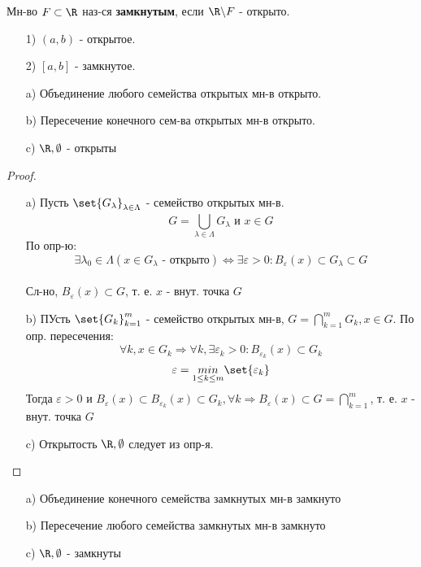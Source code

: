 \begin{definition}
Мн-во $F \subset \R$ наз-ся \textbf{замкнутым}, если $\R \backslash F$ - открыто.
\end{definition}
\begin{example}
\begin{itemize}
  \item [1) ] $(a, b)$ - открытое.
  \item [2) ] $[a, b]$ - замкнутое.
\end{itemize}
\end{example}
\begin{lemma}
  \begin{itemize}
    \item [a) ]
Объединение любого семейства открытых мн-в открыто.
    \item [b) ] Пересечение конечного сем-ва открытых мн-в открыто.
    \item [c) ] $\R, \emptyset$ - открыты
  \end{itemize}
\end{lemma}
\begin{proof}
  \begin{itemize}
    \item [a) ] Пусть $\set{G_\lambda}_{\lambda \in \Lambda}$ - семейство открытых мн-в.
      \[
        G = \bigcup_{\lambda \in \Lambda}^{}G_\lambda \text{ и } x \in G
      \]
      По опр-ю:
      \[
        \exists \lambda_0 \in \Lambda (x \in G_\lambda\text{ - открыто}) \iff \exists \varepsilon > 0 \colon B_{\varepsilon}(x) \subset G_\lambda \subset G
      \]
      \\
      Сл-но, $B_{\varepsilon}(x) \subset G$, т. е. $x$ - внут. точка $G$
    \item [b) ] ПУсть $\set{G_k}_{k = 1}^{m}$ - семейство открытых мн-в, $G = \bigcap_{k = 1}^{m} G_k, x \in G$. По опр. пересечения:
      \[
     \forall k, x \in G_k \Rightarrow \forall k, \exists \varepsilon_k > 0 \colon B_{\varepsilon_k}(x) \subset G_k
      \]
      \[
      \varepsilon = \underset{1 \leq k \leq m}{min} \set{\varepsilon_k}
      \]
      Тогда $\varepsilon > 0$ и $B_{\varepsilon}(x) \subset B_{\varepsilon_k}(x) \subset G_k, \forall k \Rightarrow B_{\varepsilon}(x) \subset G = \bigcap_{k = 1}^{m}$, т. е. $x$ - внут. точка $G$
    \item [c) ] Открытость $\R, \emptyset$ следует из опр-я.
  \end{itemize}
\end{proof}
\begin{lemma}
\begin{itemize}
  \item [a) ] Объединение конечного семейства замкнутых мн-в замкнуто
  \item [b) ] Пересечение любого семейства замкнутых мн-в замкнуто
  \item [c) ] $\R, \emptyset$ - замкнуты
\end{itemize}
\end{lemma}
